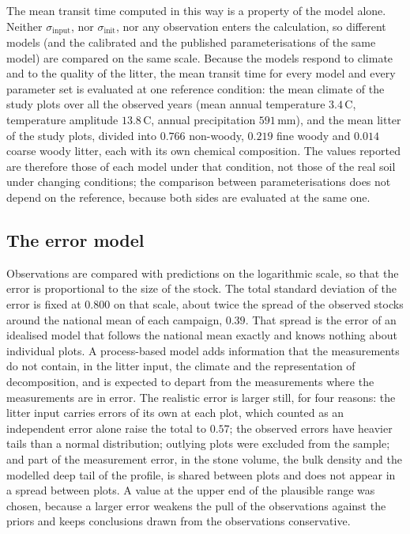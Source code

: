 \documentclass[11pt]{article}
\newcommand{\sinput}{\sigma_{\mathrm{input}}}
\newcommand{\sinit}{\sigma_{\mathrm{init}}}
\begin{document}
The mean transit time computed in this way is a property of the model alone. Neither $\sinput$,
nor $\sinit$, nor any observation enters the calculation, so different models (and the calibrated and the published parameterisations of the same model)
are compared on the same scale. 
Because the models respond to climate and to the quality of the litter, the mean transit time for every model and every parameter set
is evaluated at one reference condition: the mean climate of the study plots over all the observed
years (mean annual temperature $3.4$\,\textdegree C, temperature amplitude $13.8$\,\textdegree C,
annual precipitation $591$\,mm), and
the mean litter of the study plots, divided into $0.766$ non-woody, $0.219$ fine woody and
$0.014$ coarse woody litter, each with its own chemical composition. The values reported are
therefore those of each model under that condition, not those of the real soil under changing
conditions; the comparison between parameterisations does not depend on the reference, because
both sides are evaluated at the same one.


\subsection{The error model}\label{sec:error}

Observations are compared with predictions on the logarithmic scale, so that the error is
proportional to the size of the stock. The total standard deviation of the error is fixed at
$0.800$ on that scale, about twice the spread of the observed stocks around the national mean of
each campaign, $0.39$. That spread is the error of an idealised model that follows the national
mean exactly and knows nothing about individual plots. A process-based model adds information that
the measurements do not contain, in the litter input, the climate and the representation of
decomposition, and is expected to depart from the measurements where the measurements are in
error. The realistic error is larger still, for four reasons: the litter input carries errors of
its own at each plot, which counted as an independent error alone raise the total to $0.57$; the
observed errors have heavier tails than a normal distribution; outlying plots were excluded from
the sample; and part of the measurement error, in the stone volume, the bulk density and the
modelled deep tail of the profile, is shared between plots and does not appear in a spread between
plots. A value at the upper end of the plausible range was chosen, because a larger error weakens
the pull of the observations against the priors and keeps conclusions drawn from the observations
conservative.
\end{document}
